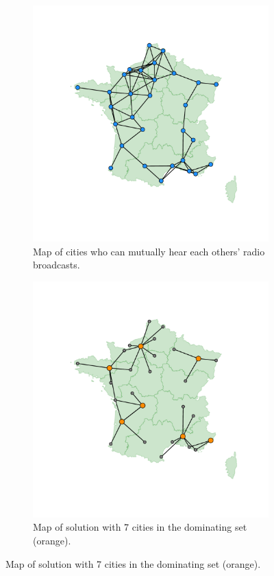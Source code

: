 \documentclass{article}
\begin{document}
\begin{figure}
\centering
\begin{subfigure}{0.45\textwidth}
\includegraphics[width=\textwidth]{adjacency}
\caption{Map of cities who can mutually hear each others' radio broadcasts.}
\label{fig:adjacency}
\end{subfigure}
\hfill
\begin{subfigure}{0.45\textwidth}
\includegraphics[width=\textwidth]{solution}
\caption{Map of solution with 7 cities in the dominating set (orange).}
\label{fig:solution}
\end{subfigure}
\end{figure}
\end{document}
